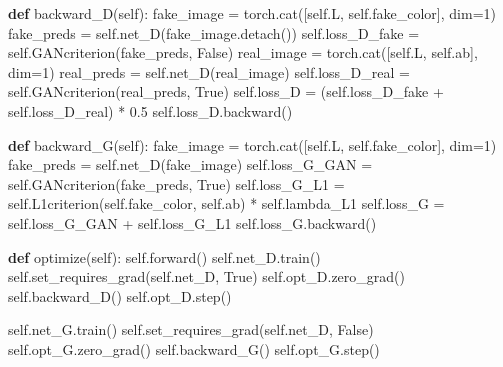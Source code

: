 \documentclass[
]{article}
\newenvironment{Shaded}{}{}
\newcommand{\DecValTok}[1]{\textcolor[rgb]{0.25,0.63,0.44}{#1}}
\newcommand{\FloatTok}[1]{\textcolor[rgb]{0.25,0.63,0.44}{#1}}
\newcommand{\KeywordTok}[1]{\textcolor[rgb]{0.00,0.44,0.13}{\textbf{#1}}}
\newcommand{\NormalTok}[1]{#1}
\newcommand{\OperatorTok}[1]{\textcolor[rgb]{0.40,0.40,0.40}{#1}}
\newcommand{\VariableTok}[1]{\textcolor[rgb]{0.10,0.09,0.49}{#1}}
\begin{document}
\begin{Shaded}
\begin{Highlighting}[]
    \KeywordTok{def}\NormalTok{ backward\_D(}\VariableTok{self}\NormalTok{):}
\NormalTok{        fake\_image }\OperatorTok{=}\NormalTok{ torch.cat([}\VariableTok{self}\NormalTok{.L, }\VariableTok{self}\NormalTok{.fake\_color], dim}\OperatorTok{=}\DecValTok{1}\NormalTok{)}
\NormalTok{        fake\_preds }\OperatorTok{=} \VariableTok{self}\NormalTok{.net\_D(fake\_image.detach())}
        \VariableTok{self}\NormalTok{.loss\_D\_fake }\OperatorTok{=} \VariableTok{self}\NormalTok{.GANcriterion(fake\_preds, }\VariableTok{False}\NormalTok{)}
\NormalTok{        real\_image }\OperatorTok{=}\NormalTok{ torch.cat([}\VariableTok{self}\NormalTok{.L, }\VariableTok{self}\NormalTok{.ab], dim}\OperatorTok{=}\DecValTok{1}\NormalTok{)}
\NormalTok{        real\_preds }\OperatorTok{=} \VariableTok{self}\NormalTok{.net\_D(real\_image)}
        \VariableTok{self}\NormalTok{.loss\_D\_real }\OperatorTok{=} \VariableTok{self}\NormalTok{.GANcriterion(real\_preds, }\VariableTok{True}\NormalTok{)}
        \VariableTok{self}\NormalTok{.loss\_D }\OperatorTok{=}\NormalTok{ (}\VariableTok{self}\NormalTok{.loss\_D\_fake }\OperatorTok{+} \VariableTok{self}\NormalTok{.loss\_D\_real) }\OperatorTok{*} \FloatTok{0.5}
        \VariableTok{self}\NormalTok{.loss\_D.backward()}
        
    \KeywordTok{def}\NormalTok{ backward\_G(}\VariableTok{self}\NormalTok{):}
\NormalTok{        fake\_image }\OperatorTok{=}\NormalTok{ torch.cat([}\VariableTok{self}\NormalTok{.L, }\VariableTok{self}\NormalTok{.fake\_color], dim}\OperatorTok{=}\DecValTok{1}\NormalTok{)}
\NormalTok{        fake\_preds }\OperatorTok{=} \VariableTok{self}\NormalTok{.net\_D(fake\_image)}
        \VariableTok{self}\NormalTok{.loss\_G\_GAN }\OperatorTok{=} \VariableTok{self}\NormalTok{.GANcriterion(fake\_preds, }\VariableTok{True}\NormalTok{)}
        \VariableTok{self}\NormalTok{.loss\_G\_L1 }\OperatorTok{=} \VariableTok{self}\NormalTok{.L1criterion(}\VariableTok{self}\NormalTok{.fake\_color, }\VariableTok{self}\NormalTok{.ab) }\OperatorTok{*} \VariableTok{self}\NormalTok{.lambda\_L1}
        \VariableTok{self}\NormalTok{.loss\_G }\OperatorTok{=} \VariableTok{self}\NormalTok{.loss\_G\_GAN }\OperatorTok{+} \VariableTok{self}\NormalTok{.loss\_G\_L1}
        \VariableTok{self}\NormalTok{.loss\_G.backward()}
    
    \KeywordTok{def}\NormalTok{ optimize(}\VariableTok{self}\NormalTok{):}
        \VariableTok{self}\NormalTok{.forward()}
        \VariableTok{self}\NormalTok{.net\_D.train()}
        \VariableTok{self}\NormalTok{.set\_requires\_grad(}\VariableTok{self}\NormalTok{.net\_D, }\VariableTok{True}\NormalTok{)}
        \VariableTok{self}\NormalTok{.opt\_D.zero\_grad()}
        \VariableTok{self}\NormalTok{.backward\_D()}
        \VariableTok{self}\NormalTok{.opt\_D.step()}
        
        \VariableTok{self}\NormalTok{.net\_G.train()}
        \VariableTok{self}\NormalTok{.set\_requires\_grad(}\VariableTok{self}\NormalTok{.net\_D, }\VariableTok{False}\NormalTok{)}
        \VariableTok{self}\NormalTok{.opt\_G.zero\_grad()}
        \VariableTok{self}\NormalTok{.backward\_G()}
        \VariableTok{self}\NormalTok{.opt\_G.step()}
\end{Highlighting}
\end{Shaded}
\end{document}
